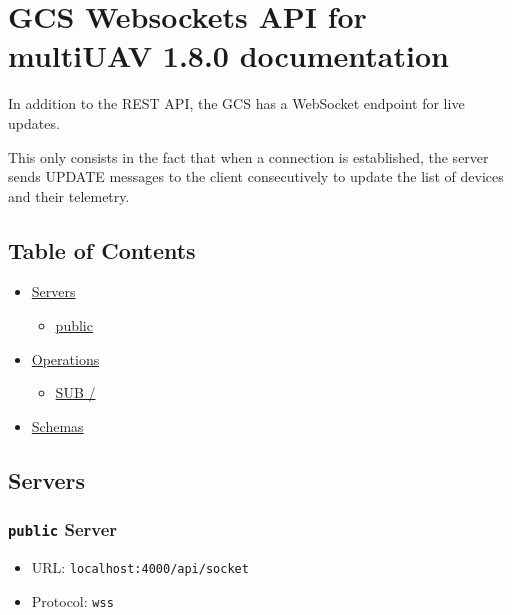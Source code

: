\documentclass[
]{article}
\author{}
\date{}
\providecommand{\tightlist}{%
  \setlength{\itemsep}{0pt}\setlength{\parskip}{0pt}}
\begin{document}
\hypertarget{gcs-websockets-api-for-multiuav-1.8.0-documentation}{%
\section{GCS Websockets API for multiUAV 1.8.0
documentation}\label{gcs-websockets-api-for-multiuav-1.8.0-documentation}}

In addition to the REST API, the GCS has a WebSocket endpoint for live
updates.

This only consists in the fact that when a connection is established,
the server sends UPDATE messages to the client consecutively to update
the list of devices and their telemetry.

\hypertarget{table-of-contents}{%
\subsection{Table of Contents}\label{table-of-contents}}

\begin{itemize}
\tightlist
\item
  \protect\hyperlink{servers}{Servers}

  \begin{itemize}
  \tightlist
  \item
    \protect\hyperlink{public-server}{public}
  \end{itemize}
\item
  \protect\hyperlink{operations}{Operations}

  \begin{itemize}
  \tightlist
  \item
    \protect\hyperlink{sub--operation}{SUB /}
  \end{itemize}
\item
  \protect\hyperlink{schemas}{Schemas}
\end{itemize}

\hypertarget{servers}{%
\subsection{Servers}\label{servers}}

\hypertarget{public-server}{%
\subsubsection{\texorpdfstring{\texttt{public}
Server}{public Server}}\label{public-server}}

\begin{itemize}
\tightlist
\item
  URL: \texttt{localhost:4000/api/socket}
\item
  Protocol: \texttt{wss}
\end{itemize}
\end{document}
